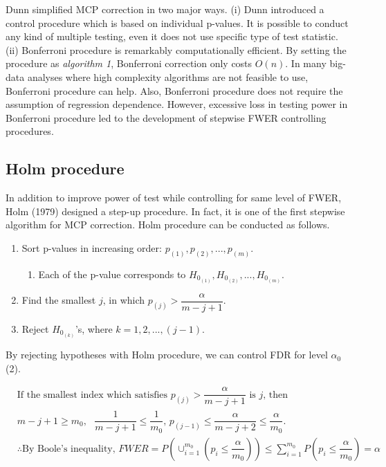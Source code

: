 \documentclass[a4paper, 11pt, oneside]{article}
\begin{document}
Dunn simplified MCP correction in two major ways. (i) Dunn introduced a control procedure which is based on individual p-values. It is possible to conduct any kind of multiple testing, even it does not use specific type of test statistic. (ii) Bonferroni procedure is remarkably computationally efficient. By setting the procedure as \textit{algorithm 1}, Bonferroni correction only costs $O(n)$. In many big-data analyses where high complexity algorithms are not feasible to use, Bonferroni procedure can help. Also, Bonferroni procedure does not require the assumption of regression dependence. However, excessive loss in testing power in Bonferroni procedure led to the development of stepwise FWER controlling procedures.

\subsection{Holm procedure}
In addition to improve power of test while controlling for same level of FWER, Holm (1979) designed a step-up procedure. In fact, it is one of the first stepwise algorithm for MCP correction. Holm procedure can be conducted as follows. 
\begin{enumerate}
  \item Sort p-values in increasing order: $p_{(1)}, p_{(2)}, ..., p_{(m)}$.
    \begin{enumerate}[-]
    \item Each of the p-value corresponds to $H_{0_{(1)}}, H_{0_{(2)}}, ..., H_{0_{(m)}}$. 
    \end{enumerate}
  \item Find the smallest $j$, in which $p_{(j)} > \dfrac{\alpha}{m-j+1}$.
  \item Reject $H_{0_{(k)}}$'s, where $k=1, 2, ..., (j-1)$.
\end{enumerate}

By rejecting hypotheses with Holm procedure, we can control FDR for level $\alpha_0$ (2).

\begin{equation}
\begin{aligned}\label{proof-bonf}
& \text{If the smallest index which satisfies } p_{(j)} > \dfrac{\alpha}{m-j+1} \text{ is } j \text{, then} \\
& m-j+1 \geq m_0,\text{ } \dfrac{1}{m-j+1} \leq \dfrac{1}{m_0} \text{,  }
p_{(j-1)} \leq \dfrac{\alpha}{m-j+2} \leq \dfrac{\alpha}{m_0}.\\
& \therefore \text{By Boole's inequality, } FWER=P(\cup_{i=1}^{m_0}(p_i\leq\dfrac{\alpha}{m_0}))\leq\sum_{i=1}^{m_0}P(p_i\leq\dfrac{\alpha}{m_0})=\alpha\\
\end{aligned}
\end{equation}
\end{document}
